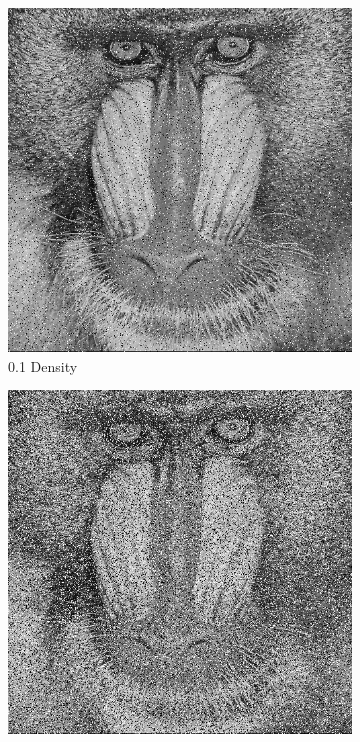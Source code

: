 \documentclass{article}
\begin{document}
\begin{figure}[h]
	\centering
	\caption {Different salt and pepper noise densities}
	\begin{subfigure}[b]{0.3\textwidth}
		\includegraphics[width = \textwidth]{Mandrill01.png}
		\caption{0.1 Density}
		\label{fig:Mandrill01.png}
	\end{subfigure}
	\begin{subfigure}[b]{0.3\textwidth}
		\includegraphics[width = \textwidth]{Mandrill03.png}

\end{subfigure}
\end{figure}
\end{document}
